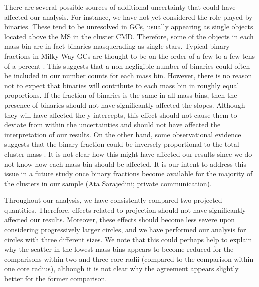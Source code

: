 There are several possible sources of additional uncertainty that
could have affected our analysis.  For 
instance, we have not yet considered the role played by binaries.
These tend to be unresolved in GCs, usually appearing as single
objects located above the MS in the 
cluster CMD.  Therefore, some of the objects in each mass bin are in
fact binaries masquerading as single stars.  Typical binary fractions
in Milky Way GCs are thought to be on the order of a few to a few tens
of a percent \citep[e.g.][]{rubenstein97, cool02, sollima08,
  davis08}.  This suggests that a non-negligible number of binaries
could often be included in our number counts for each mass bin.
However, there is no reason not to expect that binaries will
contribute to each mass bin in 
roughly equal proportions.  If the fraction of binaries is the same in
all mass bins, then the presence of binaries should not have
significantly affected the slopes.  Although they will have
affected the y-intercepts, this effect should not cause them to deviate
from within the uncertainties and 
should not have affected the interpretation of our results.  On the 
other hand, some observational evidence suggests that
the binary fraction could be inversely proportional to the total
cluster mass \citep[e.g.][]{sollima08, milone08, knigge09}.  It is not
clear how this might have affected our results since we do not know
how each mass bin should be affected.  It is our intent to address
this issue in a future study once binary fractions become available for
the majority of the clusters in our sample (Ata Sarajedini; private
communication).

Throughout our analysis, we have 
consistently compared two projected quantities.  Therefore, effects
related to projection should not have significantly affected
our results.  Moreover, these effects should become less severe upon
considering progressively larger circles, and we have performed 
our analysis for circles with three different sizes.  We note that
this could perhaps help to explain why 
the scatter in the lowest mass bins appears to become reduced for the
comparisons within two and three core radii (compared to the
comparison within one core radius), although it is not clear
why the agreement appears slightly better for the former comparison.  

